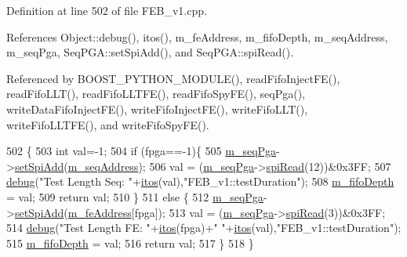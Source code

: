 Definition at line 502 of file F\+E\+B\+\_\+v1.\+cpp.



References Object\+::debug(), itos(), m\+\_\+fe\+Address, m\+\_\+fifo\+Depth, m\+\_\+seq\+Address, m\+\_\+seq\+Pga, Seq\+P\+G\+A\+::set\+Spi\+Add(), and Seq\+P\+G\+A\+::spi\+Read().



Referenced by B\+O\+O\+S\+T\+\_\+\+P\+Y\+T\+H\+O\+N\+\_\+\+M\+O\+D\+U\+L\+E(), read\+Fifo\+Inject\+F\+E(), read\+Fifo\+L\+L\+T(), read\+Fifo\+L\+L\+T\+F\+E(), read\+Fifo\+Spy\+F\+E(), seq\+Pga(), write\+Data\+Fifo\+Inject\+F\+E(), write\+Fifo\+Inject\+F\+E(), write\+Fifo\+L\+L\+T(), write\+Fifo\+L\+L\+T\+F\+E(), and write\+Fifo\+Spy\+F\+E().


\begin{DoxyCode}
502                                 \{
503   \textcolor{keywordtype}{int} val=-1;
504   \textcolor{keywordflow}{if} (fpga==-1)\{
505     \hyperlink{classFEB__v1_a6c7804ac86796f233a8393043adf2e77}{m\_seqPga}->\hyperlink{classSeqPGA_ac998ce3a6d9b5f2e88cc8393f8c1df53}{setSpiAdd}(\hyperlink{classFEB__v1_a1c1eb093fd1733b9510fcf8bc5c7ad08}{m\_seqAddress});
506     val = (\hyperlink{classFEB__v1_a6c7804ac86796f233a8393043adf2e77}{m\_seqPga}->\hyperlink{classSeqPGA_ab3d0e5e5d4014bc7a92588a76b8713d4}{spiRead}(12))&0x3FF;
507     \hyperlink{classObject_aac010553f022165573714b7014a15f0d}{debug}(\textcolor{stringliteral}{"Test Length Seq: "}+\hyperlink{Tools_8h_af330027dbdafb9a30768b3613c553e60}{itos}(val),\textcolor{stringliteral}{"FEB\_v1::testDuration"});
508     \hyperlink{classFEB__v1_a30473bcdd8f018ad5dac728f6779df9c}{m\_fifoDepth} = val;
509     \textcolor{keywordflow}{return} val;
510   \}
511   \textcolor{keywordflow}{else} \{
512     \hyperlink{classFEB__v1_a6c7804ac86796f233a8393043adf2e77}{m\_seqPga}->\hyperlink{classSeqPGA_ac998ce3a6d9b5f2e88cc8393f8c1df53}{setSpiAdd}(\hyperlink{classFEB__v1_a4e1945c2d5b434125f375e9d0fc6d99f}{m\_feAddress}[fpga]);
513     val = (\hyperlink{classFEB__v1_a6c7804ac86796f233a8393043adf2e77}{m\_seqPga}->\hyperlink{classSeqPGA_ab3d0e5e5d4014bc7a92588a76b8713d4}{spiRead}(3))&0x3FF;
514     \hyperlink{classObject_aac010553f022165573714b7014a15f0d}{debug}(\textcolor{stringliteral}{"Test Length FE: "}+\hyperlink{Tools_8h_af330027dbdafb9a30768b3613c553e60}{itos}(fpga)+\textcolor{stringliteral}{" "}+\hyperlink{Tools_8h_af330027dbdafb9a30768b3613c553e60}{itos}(val),\textcolor{stringliteral}{"FEB\_v1::testDuration"});
515     \hyperlink{classFEB__v1_a30473bcdd8f018ad5dac728f6779df9c}{m\_fifoDepth} = val;
516     \textcolor{keywordflow}{return} val;
517   \}
518 \}
\end{DoxyCode}
\mbox{\label{classFEB__v1_a7b948b40f3034ccfb0a696b5cf9c5c6c}} 
